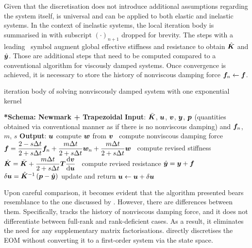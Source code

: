 Given that the discretisation  does not introduce additional assumptions regarding the system itself,  is universal and can be applied to both elastic and inelastic systems. In the context of inelastic systems, the local iteration body is summarised in  with subscript $\left(\cdot\right)_{n+1}$ dropped for brevity.
The steps with a leading \faMicrochip~symbol augment global effective stiffness and resistance to obtain $\hat{\bm{K}}$ and $\hat{\bm{y}}$. Those are additional steps that need to be computed compared to a conventional algorithm for viscously damped systems. Once convergence is achieved, it is necessary to store the history of nonviscous damping force $\bm{f}_n\leftarrow\bm{f}$.
\begin{breakablealgorithm}
\caption{iteration body of solving nonviscously damped system with one exponential kernel}\label{algo:single_model}
\begin{algorithmic}
\State \textbf{*Schema: Newmark + Trapezoidal}
\State \textbf{Input}: $\bar{\bm{K}}$, $\bm{u}$, $\bm{v}$, $\bm{y}$, $\bm{p}$ (quantities obtained via conventional manner as if there is no nonviscous damping) and $\bm{f}_n$, $m$, $s$
\State \textbf{Output}: $\bm{u}$
\State compute $\bm{w}$ from $\bm{v}$
\State \faMicrochip~compute nonviscous damping force $\bm{f}=\dfrac{2-s\Delta{}t}{2+s\Delta{}t}\bm{f}_n+\dfrac{m\Delta{}t}{2+s\Delta{}t}\bm{w}_n+\dfrac{m\Delta{}t}{2+s\Delta{}t}\bm{w}$
\State \faMicrochip~compute revised stiffness $\hat{\bm{K}}=\bar{\bm{K}}+\dfrac{m\Delta{}t}{2+s\Delta{}t}\bm{T}\dfrac{\mathrm{d}\bm{v}}{\mathrm{d}\bm{u}}$
\State \faMicrochip~compute revised resistance $\hat{\bm{y}}=\bm{y}+\bm{f}$
\State $\delta\bm{u}=\hat{\bm{K}}^{-1}\left(\bm{p}-\hat{\bm{y}}\right)$
\State update and return $\bm{u}\leftarrow\bm{u}+\delta\bm{u}$
\end{algorithmic}
\end{breakablealgorithm}

Upon careful comparison, it becomes evident that the algorithm presented bears resemblance to the one discussed by \citet{Adhikari2004}. However, there are differences between them. Specifically,  tracks the history of nonviscous damping force, and it does not differentiate between full-rank and rank-deficient cases. As a result, it eliminates the need for any supplementary matrix factorisations.  directly discretises the EOM without converting it to a first-order system via the state space.

